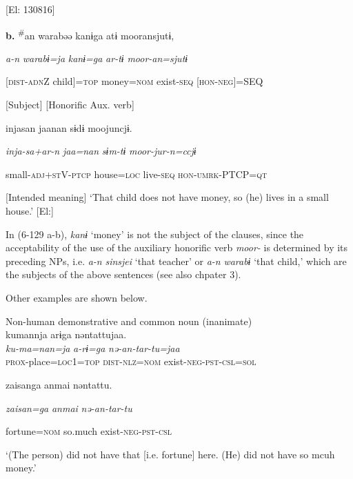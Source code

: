       [El: 130816]

  \textbf{b.}  {\TM}  \textsuperscript{\#}an  warabəə  kanɨga  atɨ  mooransjutɨ,

      \textit{a-n}  \textit{warabɨ=ja}  \textit{kanɨ=ga}  \textit{ar-tɨ}  \textit{moor-an=sjutɨ}

      [\textsc{dist}-\textsc{adn}Z  child]=\textsc{top}  money=\textsc{nom}  exist-\textsc{seq}  [\textsc{hon}-\textsc{neg}]=SEQ

      [Subject]      [Honorific Aux. verb]

      injasan  jaanan  sɨdɨ  moojuncjɨ.

      \textit{inja-sa+ar-n}  \textit{jaa=nan}  \textit{sɨm-tɨ}  \textit{moor-jur-n=ccjɨ}

      small-\textsc{adj}+\textsc{st}V-\textsc{ptcp}  house=\textsc{loc}  live-\textsc{seq}  \textsc{hon}-\textsc{umrk}-PTCP=\textsc{qt}

      [Intended meaning] ‘That child does not have money, so (he) lives in a small house.’ [El:]

In (6-129 a-b), \textit{kanɨ} ‘money’ is not the subject of the clauses, since the acceptability of the use of the auxiliary honorific verb \textit{moor-} is determined by its preceding NPs, i.e. \textit{a-n} \textit{sinsjei} ‘that teacher’ or \textit{a-n} \textit{warabɨ} ‘that child,’ which are the subjects of the above sentences (see also chpater 3).

Other examples are shown below.

\ea\label{ex:6-130}
 Non-human demonstrative and common noun (inanimate)\\

 \ea {\TM}  kumannja  arɨga  nəntattujaa.\\
\gll \textit{ku-ma=nan=ja}  \textit{a-rɨ=ga}  \textit{nə-an-tar-tu=jaa}\\

      \textsc{prox}-place=\textsc{loc}1=\textsc{top}  \textsc{dist}-\textsc{nlz}=\textsc{nom}  exist-\textsc{neg}-\textsc{pst}-\textsc{csl}=\textsc{sol}

      {\textbar}zaisan{\textbar}ga  anmai  nəntattu.

      \textit{zaisan=ga}  \textit{anmai}  \textit{nə-an-tar-tu}

      fortune=\textsc{nom}  so.much  exist-\textsc{neg}-\textsc{pst}-\textsc{csl}

\glt ‘(The person) did not have that [i.e. fortune] here. (He) did not have so mcuh money.’

